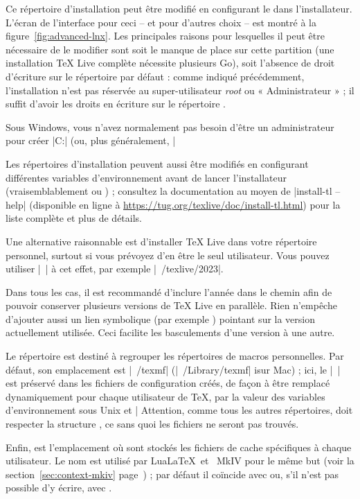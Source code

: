 \documentclass[german, english, french]{article}
\renewcommand{\TL}{\TeX{} Live\xspace}%
\newcommand\eng[1]{\foreignlanguage{english}{\emph{#1}}}
\begin{document}
Ce répertoire d'installation peut être modifié en configurant le
 dans l'installateur. L'écran de l'interface pour ceci -- et
pour d'autres choix -- est montré à la figure~\ref{fig:advanced-lnx}.  Les
principales raisons pour lesquelles il peut être nécessaire de le modifier sont
soit le manque de place sur cette partition (une installation \TL{} complète
nécessite plusieurs Go), soit l'absence de droit d'écriture sur le répertoire
par défaut : comme indiqué précédemment, l'installation n'est pas réservée au
super-utilisateur \eng{root} ou « Administrateur » ; il suffit d'avoir les
droits en écriture sur le répertoire .

Sous Windows, vous n'avez normalement pas besoin d'être un administrateur pour
créer |C:\texlive{}| (ou, plus généralement, |%

Les répertoires d'installation peuvent aussi être modifiés en configurant
différentes variables d'environnement avant de lancer l'installateur
(vraisemblablement  ou
) ; consultez la documentation au moyen de
|install-tl --help| (disponible en ligne
à \url{https://tug.org/texlive/doc/install-tl.html}) pour la liste complète et
plus de détails.

Une alternative raisonnable est d'installer \TL{} dans votre répertoire
personnel, surtout si vous prévoyez d'en être le seul utilisateur. Vous pouvez
utiliser |~| à cet effet, par exemple |~/texlive/2023|.

Dans tous les cas, il est recommandé d'inclure l'année dans le chemin afin de
pouvoir conserver plusieurs versions de \TL{} en parallèle.  Rien n'empêche
d'ajouter aussi un lien symbolique (par exemple
) pointant sur la version actuellement
utilisée. Ceci facilite les basculements d'une version à une autre.

Le répertoire  est destiné à regrouper les répertoires de
macros personnelles. Par défaut, son emplacement est |~/texmf|
(|~/Library/texmf| isur Mac) ; ici, le |~| est préservé dans les fichiers de
configuration créés, de façon à être remplacé dynamiquement pour chaque
utilisateur de \TeX, par la valeur des variables d'environnement
sous Unix et |%
Attention, comme tous les autres répertoires,  doit respecter
la structure \TDS{}, ce sans quoi les fichiers ne seront pas trouvés.

Enfin,  est l'emplacement où sont stockés les fichiers de
cache spécifiques à chaque utilisateur. Le nom  est utilisé
par Lua\LaTeX\ et \ConTeXt\ MkIV pour le même but (voir la
section~\ref{sec:context-mkiv} page~\pageref{sec:context-mkiv}) ; par défaut il
coïncide avec  ou, s'il n'est pas possible d'y écrire, avec
.
\end{document}
